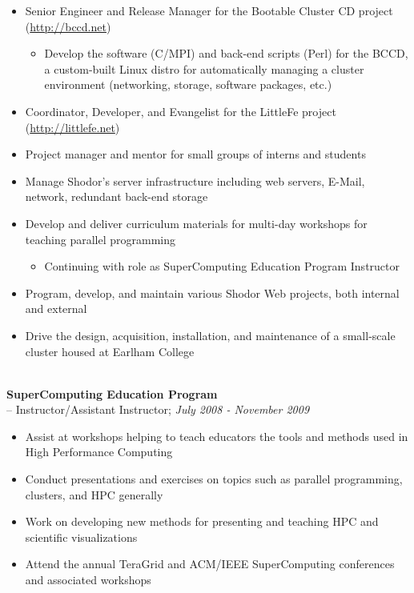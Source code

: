 \documentclass[10pt]{article}
\begin{document}
\begin{itemize}
  \addtolength{\itemsep}{-2mm}
		\item \indent Senior Engineer and Release Manager for the Bootable Cluster CD project (\url{http://bccd.net})
		\vspace{-2mm}
		\begin{itemize}
			\addtolength{\itemsep}{-2mm}
			\item Develop the software (C/MPI) and back-end scripts (Perl) for the BCCD, a custom-built Linux distro for automatically managing a cluster environment (networking, storage, software packages, etc.)
		\end{itemize}
		\vspace{-2mm}
    \item \indent Coordinator, Developer, and Evangelist for the LittleFe project (\url{http://littlefe.net})
		\item \indent Project manager and mentor for small groups of interns and students
		\item \indent Manage Shodor's server infrastructure including web servers, E-Mail, network, redundant back-end storage
		\item \indent Develop and deliver curriculum materials for multi-day workshops for teaching parallel programming
		\vspace{-2mm}
		\begin{itemize}
			\addtolength{\itemsep}{-2mm}
			\item Continuing with role as SuperComputing Education Program Instructor
		\end{itemize}
		\vspace{-2mm}
		\item \indent Program, develop, and maintain various Shodor Web projects, both internal and external
    \item \indent Drive the design, acquisition, installation, and maintenance of a small-scale cluster housed at Earlham College
\end{itemize}
~\\
\indent\textbf{SuperComputing Education Program}~\\
\indent \indent -- Instructor/Assistant Instructor; \textit{July 2008 - November 2009}
\begin{itemize}
  \addtolength{\itemsep}{-2mm}
    \item \indent Assist at workshops helping to teach educators the tools and methods used in High Performance Computing
    \item \indent Conduct presentations and exercises on topics such as parallel programming, clusters, and HPC generally
    \item \indent Work on developing new methods for presenting and teaching HPC and scientific visualizations
    \item \indent Attend the annual TeraGrid and ACM/IEEE SuperComputing conferences and associated workshops
\end{itemize}
\end{document}

